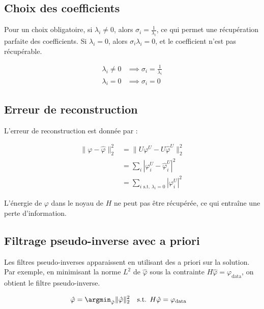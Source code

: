 \documentclass[12pt]{article}
\begin{document}
\subsection{Choix des coefficients}

Pour un choix obligatoire, si $\lambda_i \neq 0$, alors $\sigma_i = \frac{1}{\lambda_i}$, ce qui permet une récupération parfaite des coefficients. Si $\lambda_i = 0$, alors $\sigma_i \lambda_i = 0$, et le coefficient n'est pas récupérable.

\begin{align}
\lambda_i \neq 0 &\implies \sigma_i = \frac{1}{\lambda_i} \\
\lambda_i = 0 &\implies \sigma_i = 0
\end{align}

\subsection{Erreur de reconstruction}

L'erreur de reconstruction est donnée par :

\begin{align}
\|\varphi - \hat{\varphi}\|_2^2 &= \|U\varphi^U - U\hat{\varphi}^U\|_2^2 \\
&= \sum_i |\varphi_i^U - \hat{\varphi}_i^U|^2 \\
&= \sum_{i \text{ s.t. } \lambda_i = 0} |\varphi_i^U|^2
\end{align}

\begin{tcolorbox}[title={Vulgarisation simple}]
L'énergie de $\varphi$ dans le noyau de $H$ ne peut pas être récupérée, ce qui entraîne une perte d'information.
\end{tcolorbox}

\subsection{Filtrage pseudo-inverse avec a priori}

Les filtres pseudo-inverses apparaissent en utilisant des a priori sur la solution. Par exemple, en minimisant la norme $L^2$ de $\hat{\varphi}$ sous la contrainte $H\hat{\varphi} = \varphi_{\text{data}}$, on obtient le filtre pseudo-inverse.

\begin{align}
\hat{\varphi} &= \argmin_{\hat{\varphi}} \|\hat{\varphi}\|_2^2 \quad \text{s.t. } H\hat{\varphi} = \varphi_{\text{data}}
\end{align}
\end{document}
